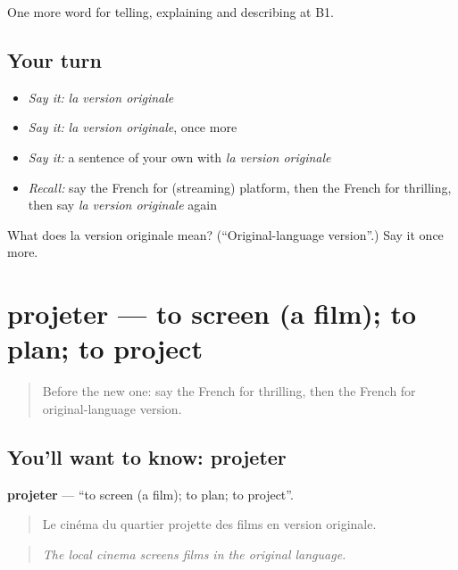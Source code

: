 \begin{grammarlens}[title={What you've built}]
One more word for telling, explaining and describing at B1.
\end{grammarlens}

\subsection*{Your turn}
\begin{itemize}
\raggedright
  \item \emph{Say it:} \emph{la version originale}
  \item \emph{Say it:} \emph{la version originale}, once more
  \item \emph{Say it:} a sentence of your own with \emph{la version originale}
  \item \emph{Recall:} say the French for (streaming) platform, then the French for thrilling, then say \emph{la version originale} again
\end{itemize}

\begin{tcolorbox}[breakable,colback=teal!4,colframe=teal!35!black,title={Before you move on}]
What does la version originale mean? (\textquotedblleft{}Original-language version\textquotedblright{}.) Say it once more.
\end{tcolorbox}
\section[projeter]{projeter — to screen (a film); to plan; to project}

\label{lesson:FR-C524-projeter}



\begin{quote}
Before the new one: say the French for thrilling, then the French for original-language version.
\end{quote}

\subsection*{You'll want to know: projeter}
\textbf{projeter} — \textquotedblleft{}to screen (a film); to plan; to project\textquotedblright{}.

\begin{quote}
Le cinéma du quartier projette des films en version originale.
\end{quote}

\begin{quote}
\emph{The local cinema screens films in the original language.}
\end{quote}

